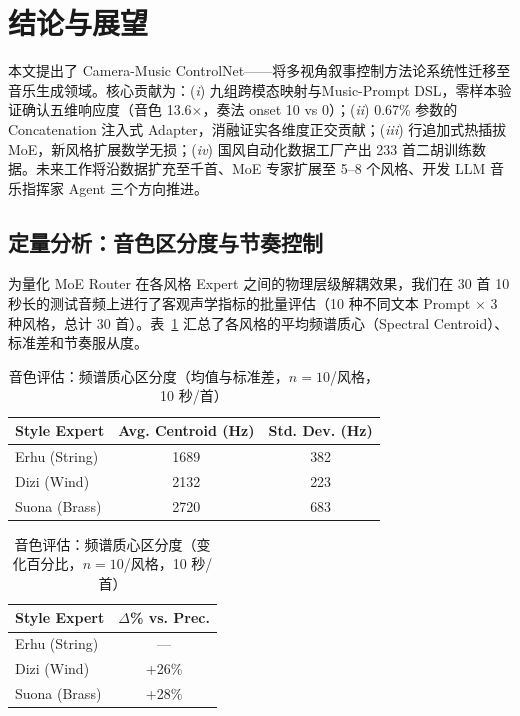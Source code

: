 \documentclass[11pt,twocolumn]{article}
\begin{document}
\section{结论与展望}

本文提出了 Camera-Music ControlNet——将多视角叙事控制方法论系统性迁移至音乐生成领域。核心贡献为：(\textit{i}) 九组跨模态映射与Music-Prompt DSL，零样本验证确认五维响应度（音色 13.6$\times$，奏法 onset 10 vs 0）；(\textit{ii}) 0.67\% 参数的 Concatenation 注入式 Adapter，消融证实各维度正交贡献；(\textit{iii}) 行追加式热插拔 MoE，新风格扩展数学无损；(\textit{iv}) 国风自动化数据工厂产出 233 首二胡训练数据。未来工作将沿数据扩充至千首、MoE 专家扩展至 5--8 个风格、开发 LLM 音乐指挥家 Agent 三个方向推进。


\subsection{定量分析：音色区分度与节奏控制}

为量化 MoE Router 在各风格 Expert 之间的物理层级解耦效果，我们在 30 首 10 秒长的测试音频上进行了客观声学指标的批量评估（10 种不同文本 Prompt $\times$ 3 种风格，总计 30 首）。表~\ref{tab:timbre_eval} 汇总了各风格的平均频谱质心（Spectral Centroid）、标准差和节奏服从度。

\begin{table}[htbp]
\centering\footnotesize
\caption{音色评估：频谱质心区分度（均值与标准差，$n=10$/风格，10 秒/首）}
\label{tab:timbre_eval}
\begin{tabular}{@{}lcc@{}}
\toprule
\textbf{Style Expert} & \textbf{Avg. Centroid (Hz)} & \textbf{Std. Dev. (Hz)} \\
\midrule
Erhu (String)  & 1689 & 382 \\
Dizi (Wind)    & 2132 & 223 \\
Suona (Brass)  & 2720 & 683 \\
\bottomrule
\end{tabular}
\end{table}

\begin{table}[htbp]
\centering\footnotesize
\caption{音色评估：频谱质心区分度（变化百分比，$n=10$/风格，10 秒/首）}
\label{tab:timbre_eval_delta} %
\begin{tabular}{@{}lc@{}}
\toprule
\textbf{Style Expert} & \textbf{$\Delta$\% vs. Prec.} \\
\midrule
Erhu (String)  & ---   \\
Dizi (Wind)    & +26\%  \\
Suona (Brass)  & +28\%  \\
\bottomrule
\end{tabular}
\end{table}
\end{document}
